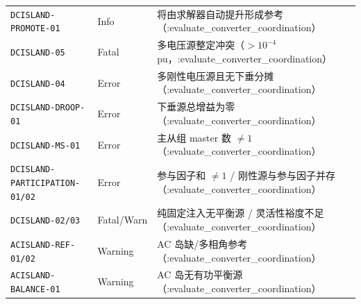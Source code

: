 \begin{center}
\begin{tabular}{@{}llp{8.6cm}@{}}
\texttt{DCISLAND-PROMOTE-01} & Info & 将由求解器自动提升形成参考（:evaluate\_converter\_coordination）\\
\texttt{DCISLAND-05} & Fatal & 多电压源整定冲突（$>10^{-4}$ pu，:evaluate\_converter\_coordination）\\
\texttt{DCISLAND-04} & Error & 多刚性电压源且无下垂分摊（:evaluate\_converter\_coordination）\\
\texttt{DCISLAND-DROOP-01} & Error & 下垂源总增益为零（:evaluate\_converter\_coordination）\\
\texttt{DCISLAND-MS-01} & Error & 主从组 master 数 $\neq1$（:evaluate\_converter\_coordination）\\
\texttt{DCISLAND-PARTICIPATION-01/02} & Error & 参与因子和 $\neq1$ / 刚性源与参与因子并存（:evaluate\_converter\_coordination）\\
\texttt{DCISLAND-02/03} & Fatal/Warn & 纯固定注入无平衡源 / 灵活性裕度不足（:evaluate\_converter\_coordination）\\
\texttt{ACISLAND-REF-01/02} & Warning & AC 岛缺/多相角参考（:evaluate\_converter\_coordination）\\
\texttt{ACISLAND-BALANCE-01} & Warning & AC 岛无有功平衡源（:evaluate\_converter\_coordination）\\
\bottomrule
\end{tabular}
\end{center}

